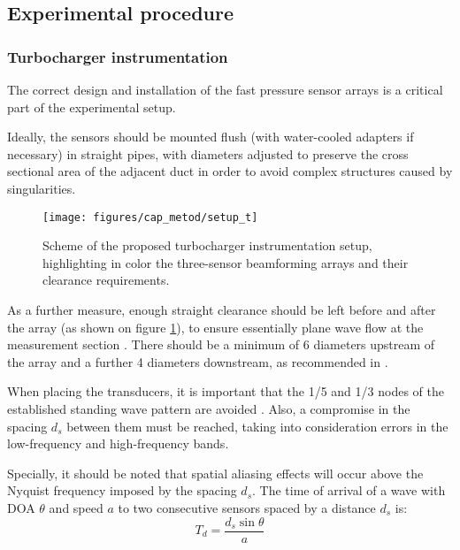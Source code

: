 \subsection{Experimental procedure}
\label{sec:experimental_procedure}

\subsubsection{Turbocharger instrumentation}
\label{sub:turbocharger_instrumentation}

The correct design and installation of the fast pressure sensor arrays is a critical part of the experimental setup.

Ideally, the sensors should be mounted flush (with water-cooled adapters if necessary) in straight pipes, with diameters adjusted to preserve the cross sectional area of the adjacent duct in order to avoid complex structures caused by singularities.

\begin{figure}[b!]
\centering
\texttt{[image: figures/cap\_metod/setup\_t]}
\caption{Scheme of the proposed turbocharger instrumentation setup, highlighting in color the three-sensor beamforming arrays and their clearance requirements.}
\label{fig:setup_schem}
\end{figure}

As a further measure, enough straight clearance should be left before and after the array (as shown on figure \ref{fig:setup_schem}), to ensure essentially plane wave flow at the measurement section \cite{holland2000measurement}. There should be a minimum of 6 diameters upstream of the array and a further 4 diameters downstream, as recommended in \cite{torregrosa2005exp}.

When placing the transducers, it is important that the 1/5 and 1/3 nodes of the established standing wave pattern are avoided \cite{dowling1983sound}. Also, a compromise in the spacing $d_s$ between them must be reached, taking into consideration errors in the  low-frequency \cite{aabom1988error} and high-frequency \cite{seybert1988two} bands.

Specially, it should be noted that spatial aliasing effects will occur above the Nyquist frequency imposed by the spacing $d_s$. The time of arrival of a wave with DOA $\theta$ and speed $a$ to two consecutive sensors spaced by a distance $d_s$ is:
\begin{equation}
  T_d = \frac{d_s \sin \theta}{a}
\end{equation}

